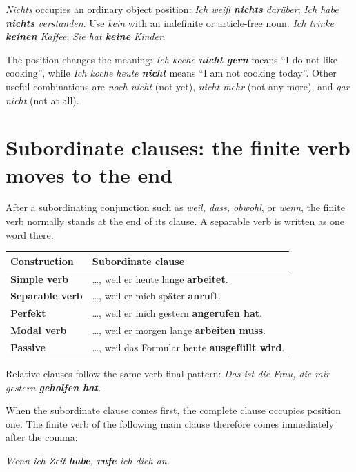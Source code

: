 \textit{Nichts} occupies an ordinary object position:
\textit{Ich weiß \textbf{nichts} darüber};
\textit{Ich habe \textbf{nichts} verstanden}. Use \textit{kein} with an
indefinite or article-free noun: \textit{Ich trinke \textbf{keinen} Kaffee};
\textit{Sie hat \textbf{keine} Kinder}.

The position changes the meaning:
\textit{Ich koche \textbf{nicht gern}} means \enquote{I do not like cooking}, while
\textit{Ich koche heute \textbf{nicht}} means \enquote{I am not cooking today}.
Other useful combinations are \textit{noch nicht} (not yet),
\textit{nicht mehr} (not any more), and \textit{gar nicht} (not at all).

\section{Subordinate clauses: the finite verb moves to the end}

After a subordinating conjunction such as \textit{weil, dass, obwohl}, or
\textit{wenn}, the finite verb normally stands at the end of its clause. A
separable verb is written as one word there.

\begin{center}
\small
{}
\begin{tabularx}{\textwidth}{@{}>{\bfseries}l X@{}}
\toprule
Construction & Subordinate clause \\
\midrule
Simple verb & \ldots{}, weil er heute lange \textbf{arbeitet}. \\
Separable verb & \ldots{}, weil er mich später \textbf{anruft}. \\
Perfekt & \ldots{}, weil er mich gestern \textbf{angerufen hat}. \\
Modal verb & \ldots{}, weil er morgen lange \textbf{arbeiten muss}. \\
Passive & \ldots{}, weil das Formular heute \textbf{ausgefüllt wird}. \\
\bottomrule
\end{tabularx}
\end{center}

Relative clauses follow the same verb-final pattern:
\textit{Das ist die Frau, die mir gestern \textbf{geholfen hat}.}

When the subordinate clause comes first, the complete clause occupies
position one. The finite verb of the following main clause therefore comes
immediately after the comma:

\begin{center}
\textit{Wenn ich Zeit \textbf{habe}, \textbf{rufe} ich dich an.}
\end{center}

